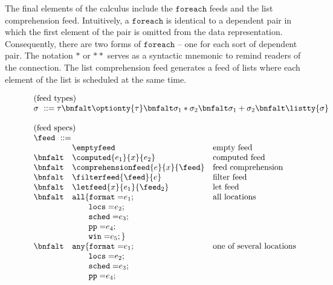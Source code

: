 The final elements of the calculus include the $\mathtt{foreach}$ feeds
and the list comprehension feed.
Intuitively, a $\mathtt{foreach}$ is identical to a dependent pair in
which the first element of the pair is omitted from the data representation.
Consequently, there are two forms of $\mathtt{foreach}$ -- one for
each sort of dependent pair.  The notation ${*}$ or ${**}$ serves as
a syntactic mnemonic to remind readers of the connection.  The list comprehension
feed generates a feed of lists where each element of the list is scheduled at the same time.

\begin{figure}[t]
\[
\begin{array}{lll}
\multicolumn{3}{l}{\mbox{(feed types)}}\\ 
\multicolumn{3}{l}{\sigma \ ::= \tau \bnfalt \optionty{\tau} 
  \bnfalt \sigma_1 * \sigma_2
  \bnfalt \sigma_1 + \sigma_2
  \bnfalt \listty{\sigma}
}   \\  
\\
\multicolumn{3}{l}{\mbox{(feed specs)}}\\ 
\multicolumn{3}{l}{\feed \ ::=}   \\  
& \emptyfeed & \mbox{empty feed} \\
 \bnfalt & \computed{e_1}{x}{e_2} & \mbox{computed feed} \\
 \bnfalt & \comprehensionfeed{e}{x}{\feed} & \mbox{feed comprehension} \\
 \bnfalt & \filterfeed{\feed}{e} & \mbox{filter feed} \\
 \bnfalt & \letfeed{x}{e_1}{\feed_2} & \mbox{let feed} \\
 \bnfalt &     \mathtt{all \{ format=} e_1; & \mbox{all locations}\\ 
& \qquad     \mathtt{locs=} e_2; & \\
& \qquad     \mathtt{sched=} e_3; & \\
& \qquad     \mathtt{pp=} e_4; & \\
& \qquad     \mathtt{win=} e_5; \}  & \\
 \bnfalt &     \mathtt{any \{ format=} e_1; & \mbox{one of several locations}\\ 
& \qquad     \mathtt{locs=} e_2; & \\
& \qquad     \mathtt{sched=} e_3; & \\
& \qquad     \mathtt{pp=} e_4; & \\

\end{array}\]
\end{figure}
